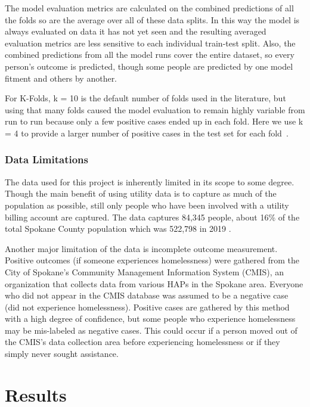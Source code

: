 \documentclass[10pt,letterpaper]{article}
\begin{document}
The model evaluation metrics are calculated on the combined predictions of all the folds so are the average over all of these data splits. In this way the model is always evaluated on data it has not yet seen and the resulting averaged evaluation metrics are less sensitive to each individual train-test split. Also, the combined predictions from all the model runs cover the entire dataset, so every person's outcome is predicted, though some people are predicted by one model fitment and others by another.

For K-Folds, k = 10 is the default number of folds used in the literature, but using that many folds caused the model evaluation to remain highly variable from run to run because only a few positive cases ended up in each fold. Here we use  k = 4 to provide a larger number of positive cases in the test set for each fold~\cite{marcot2020optimal}.

\subsubsection*{Data Limitations}
The data used for this project is inherently limited in its scope to some degree. Though the main benefit of using utility data is to capture as much of the population as possible, still only people who have been involved with a utility billing account are captured. The data captures 84,345 people, about 16\% of the total Spokane County population which was 522,798 in 2019 \cite{SpokanePop}.

Another major limitation of the data is incomplete outcome measurement. Positive outcomes (if someone experiences homelessness) were gathered from the City of Spokane's Community Management Information System (CMIS), an organization that collects data from various HAPs in the Spokane area. Everyone who did not appear in the CMIS database was assumed to be a negative case (did not experience homelessness). Positive cases are gathered by this method with a high degree of confidence, but some people who experience homelessness may be mis-labeled as negative cases. This could occur if a person moved out of the CMIS's data collection area before experiencing homelessness or if they simply never sought assistance.

\section*{Results}
\end{document}
